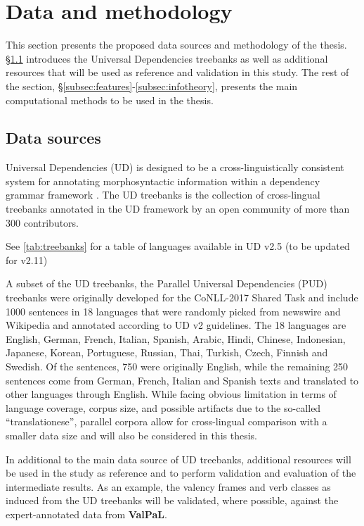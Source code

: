 \section{Data and methodology}\label{sec:methodology}

This section presents the proposed data sources and methodology of the thesis. \S\ref{subsec:data-sources} introduces the Universal Dependencies treebanks as well as additional resources that will be used as reference and validation in this study. The rest of the section, \S\ref{subsec:features}-\ref{subsec:infotheory}, presents the main computational methods to be used in the thesis.

\subsection{Data sources}\label{subsec:data-sources}

Universal Dependencies (UD) is designed to be a cross-linguistically consistent system for annotating morphosyntactic information within a dependency grammar framework \citep{demarneffe2021}. The UD treebanks \citep{universaldep} is the collection of cross-lingual treebanks annotated in the UD framework by an open community of more than 300 contributors. 



See \ref{tab:treebanks} for a table of languages available in UD v2.5 (to be updated for v2.11)


A subset of the UD treebanks, the Parallel Universal Dependencies (PUD) treebanks were originally developed for the CoNLL-2017 Shared Task \citep{zeman2017} and include 1000 sentences in 18 languages that were randomly picked from newswire and Wikipedia and annotated according to UD v2 guidelines. The 18 languages are English, German, French, Italian, Spanish, Arabic, Hindi, Chinese, Indonesian, Japanese, Korean, Portuguese, Russian, Thai, Turkish, Czech, Finnish and Swedish. Of the sentences, 750 were originally English, while the remaining 250 sentences come from German, French, Italian and Spanish texts and translated to other languages through English. While facing obvious limitation in terms of language coverage, corpus size, and possible artifacts due to the so-called ``translationese'', parallel corpora allow for cross-lingual comparison with a smaller data size and will also be considered in this thesis.

In additional to the main data source of UD treebanks, additional resources will be used in the study as reference and to perform validation and evaluation of the intermediate results. As an example, the valency frames and verb classes as induced from the UD treebanks will be validated, where possible, against the expert-annotated data from \textbf{ValPaL}\citep{valpal}. 

